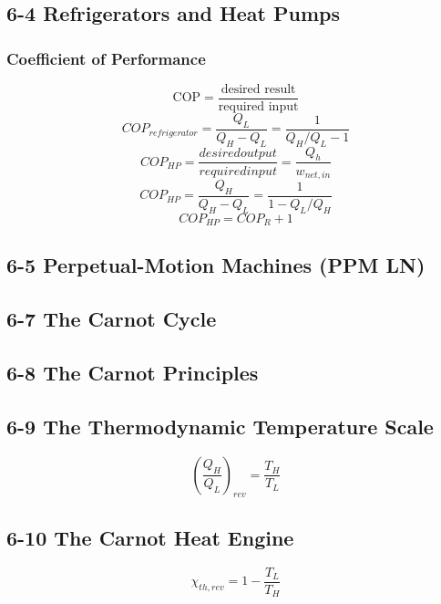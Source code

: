 \documentclass[10pt,landscape]{article}
\begin{document}
\begin{multicols}{3}
\subsection{6-4 Refrigerators and Heat Pumps}
\subsubsection{Coefficient of Performance}
\begin{equation}
    \text{COP}=\frac{\text{desired result}}{\text{required input}}
\end{equation}
\begin{equation}
     COP_{refrigerator}=\frac{Q_L}{Q_H-Q_L}=\frac{1}{Q_H/Q_L-1}
\end{equation}
\begin{equation}
    COP_{HP}=\frac{desired output}{required input}=\frac{Q_h}{w_{net,in}}
\end{equation}
\begin{equation}
    COP_{HP}=\frac{Q_H}{Q_H-Q_L}=\frac{1}{1-Q_L/Q_H}
\end{equation}
\begin{equation}
    COP_{HP}=COP_R+1
\end{equation}
\subsection{6-5 Perpetual-Motion Machines (PPM LN)}
\subsection{6-7 The Carnot Cycle}
\subsection{6-8 The Carnot Principles}
\subsection{6-9 The Thermodynamic Temperature Scale}
\begin{equation}
    (\frac{Q_H}{Q_L})_{rev}=\frac{T_H}{T_L}
\end{equation}
\subsection{6-10 The Carnot Heat Engine}
\begin{equation}
    \chi_{th,rev}=1-\frac{T_L}{T_H}
\end{equation}

\end{multicols}
\end{document}
